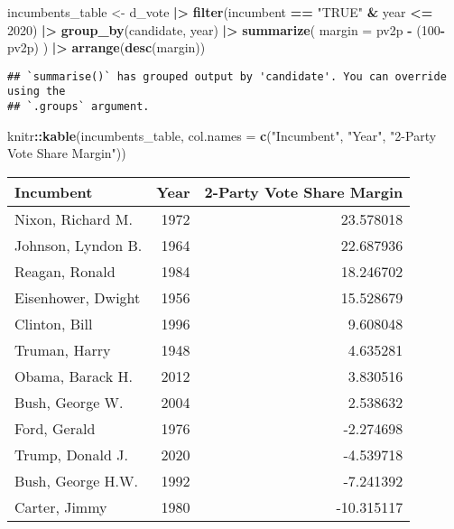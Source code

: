 \documentclass[
]{article}
\newenvironment{Shaded}{\begin{snugshade}}{\end{snugshade}}
\newcommand{\AttributeTok}[1]{\textcolor[rgb]{0.13,0.29,0.53}{#1}}
\newcommand{\DecValTok}[1]{\textcolor[rgb]{0.00,0.00,0.81}{#1}}
\newcommand{\FunctionTok}[1]{\textcolor[rgb]{0.13,0.29,0.53}{\textbf{#1}}}
\newcommand{\NormalTok}[1]{#1}
\newcommand{\OtherTok}[1]{\textcolor[rgb]{0.56,0.35,0.01}{#1}}
\newcommand{\SpecialCharTok}[1]{\textcolor[rgb]{0.81,0.36,0.00}{\textbf{#1}}}
\newcommand{\StringTok}[1]{\textcolor[rgb]{0.31,0.60,0.02}{#1}}
\begin{document}
\begin{Shaded}
\begin{Highlighting}[]
\NormalTok{incumbents\_table }\OtherTok{\textless{}{-}}\NormalTok{ d\_vote }\SpecialCharTok{|\textgreater{}}
  \FunctionTok{filter}\NormalTok{(incumbent }\SpecialCharTok{==} \StringTok{"TRUE"} \SpecialCharTok{\&}\NormalTok{ year }\SpecialCharTok{\textless{}=} \DecValTok{2020}\NormalTok{) }\SpecialCharTok{|\textgreater{}}
  \FunctionTok{group\_by}\NormalTok{(candidate, year) }\SpecialCharTok{|\textgreater{}}
  \FunctionTok{summarize}\NormalTok{(}
    \AttributeTok{margin =}\NormalTok{ pv2p }\SpecialCharTok{{-}}\NormalTok{ (}\DecValTok{100}\SpecialCharTok{{-}}\NormalTok{pv2p)}
\NormalTok{  ) }\SpecialCharTok{|\textgreater{}}
  \FunctionTok{arrange}\NormalTok{(}\FunctionTok{desc}\NormalTok{(margin))}
\end{Highlighting}
\end{Shaded}

\begin{verbatim}
## `summarise()` has grouped output by 'candidate'. You can override using the
## `.groups` argument.
\end{verbatim}

\begin{Shaded}
\begin{Highlighting}[]
\NormalTok{knitr}\SpecialCharTok{::}\FunctionTok{kable}\NormalTok{(incumbents\_table, }\AttributeTok{col.names =} \FunctionTok{c}\NormalTok{(}\StringTok{"Incumbent"}\NormalTok{, }\StringTok{"Year"}\NormalTok{, }\StringTok{"2{-}Party Vote Share Margin"}\NormalTok{))}
\end{Highlighting}
\end{Shaded}

\begin{longtable}[]{@{}lrr@{}}
\toprule\noalign{}
Incumbent & Year & 2-Party Vote Share Margin \\
\midrule\noalign{}
\endhead
\bottomrule\noalign{}
\endlastfoot
Nixon, Richard M. & 1972 & 23.578018 \\
Johnson, Lyndon B. & 1964 & 22.687936 \\
Reagan, Ronald & 1984 & 18.246702 \\
Eisenhower, Dwight & 1956 & 15.528679 \\
Clinton, Bill & 1996 & 9.608048 \\
Truman, Harry & 1948 & 4.635281 \\
Obama, Barack H. & 2012 & 3.830516 \\
Bush, George W. & 2004 & 2.538632 \\
Ford, Gerald & 1976 & -2.274698 \\
Trump, Donald J. & 2020 & -4.539718 \\
Bush, George H.W. & 1992 & -7.241392 \\
Carter, Jimmy & 1980 & -10.315117 \\
\end{longtable}
\end{document}
